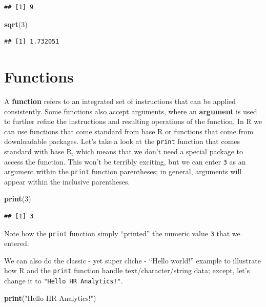 \documentclass[]{book}
\newenvironment{Shaded}{\begin{snugshade}}{\end{snugshade}}
\newcommand{\KeywordTok}[1]{\textcolor[rgb]{0.13,0.29,0.53}{\textbf{#1}}}
\newcommand{\DecValTok}[1]{\textcolor[rgb]{0.00,0.00,0.81}{#1}}
\newcommand{\StringTok}[1]{\textcolor[rgb]{0.31,0.60,0.02}{#1}}
\newcommand{\NormalTok}[1]{#1}
\begin{document}
\begin{verbatim}
## [1] 9
\end{verbatim}

\begin{Shaded}
\begin{Highlighting}[]
\KeywordTok{sqrt}\NormalTok{(}\DecValTok{3}\NormalTok{)}
\end{Highlighting}
\end{Shaded}

\begin{verbatim}
## [1] 1.732051
\end{verbatim}

\section{Functions}\label{functions}

A \textbf{function} refers to an integrated set of instructions that can
be applied consistently. Some functions also accept arguments, where an
\textbf{argument} is used to further refine the instructions and
resulting operations of the function. In R we can use functions that
come standard from base R or functions that come from downloadable
packages. Let's take a look at the \texttt{print} function that comes
standard with base R, which means that we don't need a special package
to access the function. This won't be terribly exciting, but we can
enter \texttt{3} as an argument within the \texttt{print} function
parentheses; in general, arguments will appear within the inclusive
parentheses.

\begin{Shaded}
\begin{Highlighting}[]
\KeywordTok{print}\NormalTok{(}\DecValTok{3}\NormalTok{)}
\end{Highlighting}
\end{Shaded}

\begin{verbatim}
## [1] 3
\end{verbatim}

Note how the \texttt{print} function simply ``printed'' the numeric
value \texttt{3} that we entered.

We can also do the classic - yet super cliche - ``Hello world!'' example
to illustrate how R and the \texttt{print} function handle
text/character/string data; except, let's change it to
\texttt{"Hello\ HR\ Analytics!"}.

\begin{Shaded}
\begin{Highlighting}[]
\KeywordTok{print}\NormalTok{(}\StringTok{"Hello HR Analytics!"}\NormalTok{)}
\end{Highlighting}
\end{Shaded}
\end{document}
